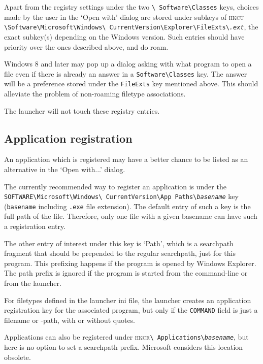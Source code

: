 \documentclass[11pt,a4paper,oneside]{report}
\let\bsl\textbackslash
\def\bslb{\bsl\discretionary{}{}{}}
\def\hkcu{\textsc{hkcu}}
\def\hkcr{\textsc{hkcr}}
\begin{document}
{\sloppy
Apart from the registry settings under the two \texttt{\bslb
  Software\bslb Classes} keys, choices made by the user in the `Open
with\textellipsis' dialog are stored under subkeys of \hkcu
\texttt{\bslb Software\bslb Microsoft\bslb Windows\bslb
  CurrentVersion\bslb Explorer\bslb FileExts\bslb \emph{.ext}}, the
exact subkey(s) depending on the Windows version. Such entries
should have priority over the ones described above, and do roam.\par}

Windows 8 and later may pop up a dialog asking with what program to
open a file even if there is already an answer in a
\texttt{Software\bslb Classes} key. The answer will be a preference
stored under the \texttt{FileExts} key mentioned above. This should
alleviate the problem of non-roaming filetype associations.

The launcher will not touch these registry entries.

\subsection{Application registration}
\label{sec:appreg}

An application which is registered may have a better chance to be listed
as an alternative in the `Open with...' dialog.

{\sloppy The currently recommended way to register an application is
  under the \texttt{SOFTWARE\bsl Microsoft\bslb Windows\bslb
    CurrentVersion\bslb App Paths\bslb \emph{basename}} key
  (\texttt{basename} including \texttt{.exe} file extension). The
  default entry of such a key is the full path of the
  file. Therefore, only one file with a given basename can have such
  a registration entry.\par}

The other entry of interest under this key is `Path', which is a
searchpath fragment that should be prepended to the regular
searchpath, just for this program. This prefixing happens if the
program is opened by Windows Explorer. The path prefix is ignored
if the program is started from the command-line or from the
launcher.

For filetypes defined in the launcher ini file, the launcher creates
an application registration key for the associated program, but only
if the \texttt{COMMAND} field is just a filename or -path, with or
without quotes.

{\sloppy
Applications can also be registered under \hkcr \texttt{\bslb
  Applications\bslb \emph{basename}}, but here is no option to set a
searchpath prefix. Microsoft considers this location obsolete.\par}
\end{document}
